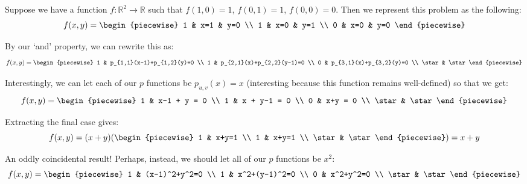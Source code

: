 \begin{example}
    Suppose we have a function $f:\mathbb{R}^2\to\mathbb{R}$ such that $f(1,0)=1$, $f(0,1)=1$, $f(0,0)=0$. Then we represent this problem as the following:
    $$
        f(x,y) = \begin{piecewise}
            1 & x=1 & y=0 \\
            1 & x=0 & y=1 \\
            0 & x=0 & y=0
        \end{piecewise}
    $$

    By our `and' property, we can rewrite this as:
    $$
        f(x,y) = \begin{piecewise}
            1 & p_{1,1}(x-1)+p_{1,2}(y)=0 \\
            1 & p_{2,1}(x)+p_{2,2}(y-1)=0 \\
            0 & p_{3,1}(x)+p_{3,2}(y)=0 \\
            \star & \star
        \end{piecewise}
    $$

    Interestingly, we can let each of our $p$ functions be $p_{u,v}(x)=x$ (interesting because this function remains well-defined) so that we get:
    $$
        f(x,y) = \begin{piecewise}
            1 & x-1 + y = 0 \\
            1 & x + y-1 = 0 \\
            0 & x+y = 0 \\
            \star & \star
        \end{piecewise}
    $$

    Extracting the final case gives:
    $$
        f(x,y) = (x+y)\paren*{\begin{piecewise}
            1 & x+y=1 \\
            1 & x+y=1 \\
            \star & \star
        \end{piecewise}}=x+y
    $$

    An oddly coincidental result! Perhaps, instead, we should let all of our $p$ functions be $x^2$:
    $$
        f(x,y) = \begin{piecewise}
            1 & (x-1)^2+y^2=0 \\
            1 & x^2+(y-1)^2=0 \\
            0 & x^2+y^2=0 \\
            \star & \star
        \end{piecewise}
    $$


\end{example}
